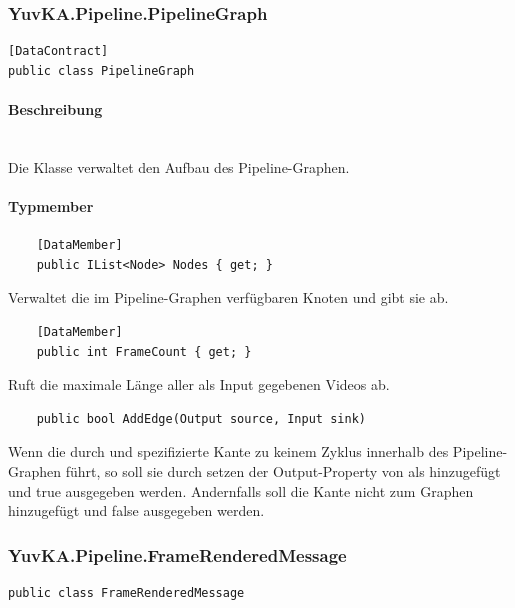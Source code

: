 \subsubsection{YuvKA.Pipeline.PipelineGraph}
	
\begin{verbatim}
[DataContract]
public class PipelineGraph	
\end{verbatim}

\paragraph{Beschreibung}~\\
Die Klasse  verwaltet den Aufbau des Pipeline-Graphen. 
	
\paragraph{Typmember}
\begin{itemize}

	\begin{verbatim}
	[DataMember]
	public IList<Node> Nodes { get; }
	\end{verbatim}
	Verwaltet die im Pipeline-Graphen verfügbaren Knoten und gibt sie ab.

	\begin{verbatim}
	[DataMember]
	public int FrameCount { get; }
	\end{verbatim}
	Ruft die maximale Länge aller als Input gegebenen Videos ab.


	
	\begin{verbatim}
	public bool AddEdge(Output source, Input sink)
	\end{verbatim}
	Wenn die durch  und  spezifizierte Kante zu keinem Zyklus innerhalb des Pipeline-Graphen führt, so soll sie durch setzen der Output-Property von  als  hinzugefügt und true ausgegeben werden. Andernfalls soll die Kante nicht zum Graphen hinzugefügt und false ausgegeben werden.
\end{itemize}
	
\subsubsection{YuvKA.Pipeline.FrameRenderedMessage}
		
\begin{verbatim}
public class FrameRenderedMessage
\end{verbatim}

